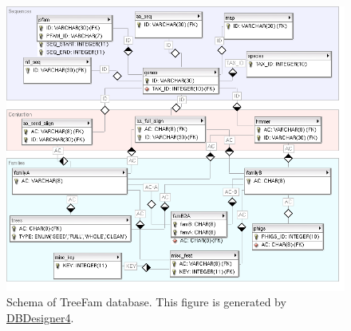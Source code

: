\begin{figure}[!hb]
\includegraphics[width=\textwidth]{schemata.png}
\caption[Schema of TreeFam database]{Schema of TreeFam database. This figure is generated by
\href{http://www.fabforce.net/dbdesigner4/}{DBDesigner4}.}\label{fig:schemata}
\end{figure}

